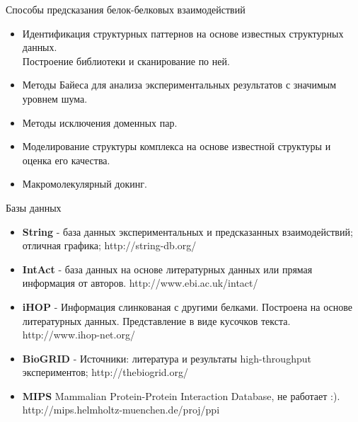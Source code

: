\begin{frame}{Способы предсказания белок-белковых взаимодействий}
    \begin{itemize}
        \item Идентификация структурных паттернов на основе известных структурных данных. \\
            Построение библиотеки и сканирование по ней.
        \item Методы Байеса для анализа экспериментальных результатов с значимым уровнем шума.
        \item Методы исключения доменных  пар. 
        \item Моделирование структуры комплекса на основе известной структуры и оценка его качества.
        \item Макромолекулярный докинг. 
    \end{itemize}
\end{frame}

  \begin{frame}{Базы данных}
      \begin{itemize}
          \item \textbf{String} - база данных экспериментальных и предсказанных  взаимодействий; отличная графика;
              http://string-db.org/
          \item \textbf{IntAct} - база данных  на основе литературных  данных или прямая информация от авторов.
              http://www.ebi.ac.uk/intact/
          \item \textbf{iHOP} - Информация слинкованая с другими белками. Построена на основе литературных  данных.
              Представление в виде кусочков текста. http://www.ihop-net.org/
          \item \textbf{BioGRID} - Источники: литература и результаты high-throughput экспериментов; 
              http://thebiogrid.org/
          \item \textbf{MIPS}   Mammalian Protein-Protein Interaction Database, не работает :). 
              http://mips.helmholtz-muenchen.de/proj/ppi
      \end{itemize}
  \end{frame}

